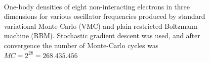 \begin{figure} [H]%
	\centering
	\\
	
	\caption{One-body densities of eight non-interacting electrons in three dimensions for various oscillator frequencies produced by standard variational Monte-Carlo (VMC) and plain restricted Boltzmann machine (RBM). Stochastic gradient descent was used, and after convergence the number of Monte-Carlo cycles was $MC=2^{28}=268.435.456$}%
	\label{fig:OB_interaction_8P_3D}
\end{figure}